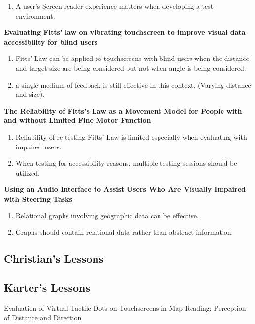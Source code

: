 \documentclass{article}
\begin{document}
\begin{enumerate}
    \item A user's Screen reader experience matters when developing a test environment.
\end{enumerate}

\cite{} \textbf{Evaluating Fitts’ law on vibrating touchscreen to improve visual data accessibility for blind users } \cite{}

\begin{enumerate}
    \item Fitts' Law can be applied to touchscreens with blind users when the distance and target size are being considered but not when angle is being considered. 
    \item a single medium of feedback is still effective in this context. (Varying distance and size).
\end{enumerate}

\cite{} \textbf{The Reliability of Fitts’s Law as a Movement Model for People with and without Limited Fine Motor Function } \cite{}

\begin{enumerate}
    \item Reliability of re-testing Fitts' Law is limited especially when evaluating with impaired users. 
    \item When testing for accessibility reasons, multiple testing sessions should be utilized. 
\end{enumerate}

\cite{} \textbf{Using an Audio Interface to Assist Users Who Are Visually Impaired with Steering Tasks } \cite{}

\begin{enumerate}
    \item Relational graphs involving geographic data can be effective. 
    \item Graphs should contain relational data rather than abstract information. 
\end{enumerate}



\subsection{Christian's Lessons}




\subsection{Karter's Lessons}
Evaluation of Virtual Tactile Dots on Touchscreens in Map Reading: Perception of Distance and Direction 
\end{document}
